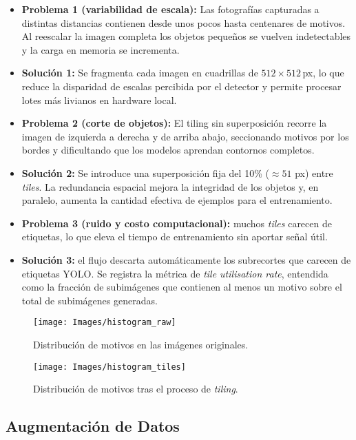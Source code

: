 \begin{itemize}
   \item \textbf{Problema 1 (variabilidad de escala):}
   Las fotografías capturadas a distintas distancias contienen desde unos pocos hasta centenares de motivos.
   Al reescalar la imagen completa los objetos pequeños se vuelven indetectables y la carga en memoria se incrementa.
   \item \textbf{Solución 1:}
   Se fragmenta cada imagen en cuadrillas de \(512\times512\)\,px, lo que reduce la disparidad de escalas percibida por el detector y permite procesar lotes más livianos en hardware local.

   \item \textbf{Problema 2 (corte de objetos):}
   El tiling sin superposición recorre la imagen de izquierda a derecha y de arriba abajo, seccionando motivos por los bordes y dificultando que los modelos aprendan contornos completos.
   \item \textbf{Solución 2:}
   Se introduce una superposición fija del 10\% ($\approx 51$ px) entre \emph{tiles}.
   La redundancia espacial mejora la integridad de los objetos y, en paralelo, aumenta la cantidad efectiva de ejemplos para el entrenamiento.

   \item \textbf{Problema 3 (ruido y costo computacional):} muchos \emph{tiles} carecen de etiquetas, lo que eleva el tiempo de entrenamiento sin aportar señal útil.
   \item \textbf{Solución 3:} el flujo descarta automáticamente los subrecortes que carecen de etiquetas YOLO.
      Se registra la métrica de \emph{tile utilisation rate}, entendida como la fracción de subimágenes que contienen al menos un motivo sobre el total de subimágenes generadas.
\end{itemize}

\begin{figure}[htpb]
  \centering
  \texttt{[image: Images/histogram\_raw]}
  \caption{Distribución de motivos en las imágenes originales.}
  \label{fig:hist_raw}
\end{figure}

\begin{figure}[htpb]
  \centering
  \texttt{[image: Images/histogram\_tiles]}
  \caption{Distribución de motivos tras el proceso de \textit{tiling}.}
  \label{fig:hist_tiles}
\end{figure}

\subsection{Augmentación de Datos}\label{ssec:augmentacion}

